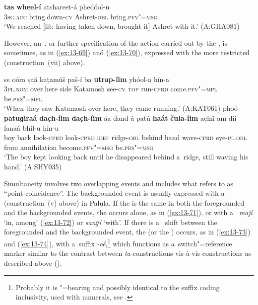 \ex
\label{ex:13-68}
\gll \textbf{tas} \textbf{wheel-í} atshareet-á phedóol-u\\
\textsc{3sg.acc} bring.down-\textsc{cv} Ashret-\textsc{obl} bring.\textsc{pfv"=msg} \\
\glt `We reached [lit: having taken down, brought it] Ashret with it.' (A:GHA081) 
\z

However, an~, or further specification of the action carried out by the , is sometimes, as in (\ref{ex:13-69}) and (\ref{ex:13-70}), expressed with the more restricted  (construction~(vii) above).

\ea
\label{ex:13-69}
\gll se oóra ṣaá kaṭamúš paš-í ba \textbf{utrap-íim} yhóol-a hín-a \\
\textsc{3pl.nom} over.here side Katamosh see-\textsc{cv} \textsc{top} run-\textsc{cprd} come.\textsc{pfv"=mpl} be.\textsc{prs"=mpl} \\
\glt `When they saw Katamosh over here, they came running.' (A:KAT061)
\ex
\label{ex:13-70}
\gll phoó \textbf{patuɡiraá} \textbf{dac̣h-íim} \textbf{dac̣h-íim} áa dand-á patú \textbf{haát} \textbf{čula-íim} ac̣híi-am díi fanaá bhíl-u hín-u\\
boy back look-\textsc{cprd} look-\textsc{cprd} \textsc{idef}  ridge-\textsc{obl} behind hand wave-\textsc{cprd} eye-\textsc{pl.obl} from  annihilation become.\textsc{pfv"=msg} be.\textsc{prs"=msg}\\
\glt `The boy kept looking back until he disappeared behind a~ridge, still waving his hand.' (A:SHY035) 
\z

 Simultaneity involves two overlapping events and includes what
\citet[330]{givon2001b} refers to as ``point coincidence''. The backgrounded event
\citep[254--255]{thompsonetal2007} is usually expressed with a~ (construction~(v) above) in
Palula. If the  is the same in both the foregrounded and the backgrounded events, the
 occurs alone, as in (\ref{ex:13-71}), or with a~ \textit{maǰí} `in,
among' (\ref{ex:13-72}) or \textit{sanɡí} `with'. If there is a~ shift between
the foregrounded and the backgrounded event, the  (or the ) occurs, as in
(\ref{ex:13-73}) and (\ref{ex:13-74}), with a~suffix \textit{-eé},\footnote{Probably it is "=bearing and possibly identical to the suffix coding inclusivity, used with numerals, see .} which functions as a~switch"=reference marker similar to the contrast between
\textit{ta}-constructions vis-à-vis  constructions as described above ().

